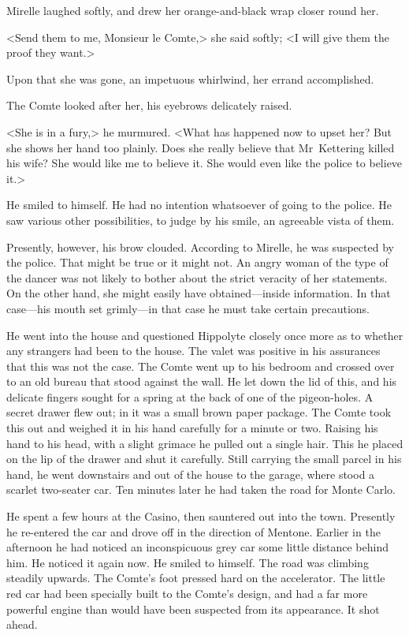 Mirelle laughed softly, and drew her orange-and-black wrap closer round her.

<Send them to me, Monsieur le Comte,> she said softly; <I will give them the proof they want.>

Upon that she was gone, an impetuous whirlwind, her errand accomplished.

The Comte looked after her, his eyebrows delicately raised.

<She is in a fury,> he murmured. <What has happened now to upset her? But she shows her hand too plainly. Does she really believe that Mr~Kettering killed his wife? She would like me to believe it. She would even like the police to believe it.>

He smiled to himself. He had no intention whatsoever of going to the police. He saw various other possibilities, to judge by his smile, an agreeable vista of them.

Presently, however, his brow clouded. According to Mirelle, he was suspected by the police. That might be true or it might not. An angry woman of the type of the dancer was not likely to bother about the strict veracity of her statements. On the other hand, she might easily have obtained—inside information. In that case—his mouth set grimly—in that case he must take certain precautions.

He went into the house and questioned Hippolyte closely once more as to whether any strangers had been to the house. The valet was positive in his assurances that this was not the case. The Comte went up to his bedroom and crossed over to an old bureau that stood against the wall. He let down the lid of this, and his delicate fingers sought for a spring at the back of one of the pigeon-holes. A secret drawer flew out; in it was a small brown paper package. The Comte took this out and weighed it in his hand carefully for a minute or two. Raising his hand to his head, with a slight grimace he pulled out a single hair. This he placed on the lip of the drawer and shut it carefully. Still carrying the small parcel in his hand, he went downstairs and out of the house to the garage, where stood a scarlet two-seater car. Ten minutes later he had taken the road for Monte Carlo.

He spent a few hours at the Casino, then sauntered out into the town. Presently he re-entered the car and drove off in the direction of Mentone. Earlier in the afternoon he had noticed an inconspicuous grey car some little distance behind him. He noticed it again now. He smiled to himself. The road was climbing steadily upwards. The Comte's foot pressed hard on the accelerator. The little red car had been specially built to the Comte's design, and had a far more powerful engine than would have been suspected from its appearance. It shot ahead.

